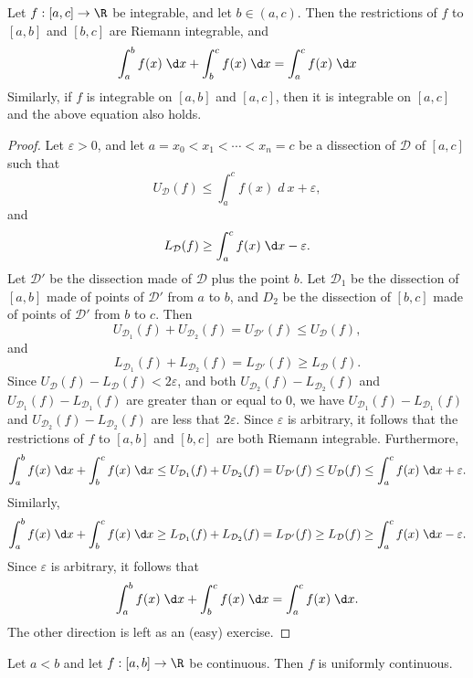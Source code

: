\documentclass[a4paper]{article}
\begin{document}
\begin{prop}
  Let $f: [a, c] \to \R$ be integrable, and let $b\in (a, c)$. Then the restrictions of $f$ to $[a, b]$ and $[b, c]$ are Riemann integrable, and
  \[
    \int_a^b f(x)\;\d x + \int_b^c f(x)\;\d x = \int_a^c f(x) \;\d x
  \]
  Similarly, if $f$ is integrable on $[a, b]$ and $[a, c]$, then it is integrable on $[a, c]$ and the above equation also holds.
\end{prop}

\begin{proof}
  Let $\varepsilon> 0$, and let $a = x_0 < x_1 < \cdots < x_n = c$ be a dissection of $\mathcal{D}$ of $[a, c]$ such that
  \[
    U_\mathcal{D}(f) \leq \int_a^c f(x)\;d\ x + \varepsilon,
  \]
  and
  \[
    L_\mathcal{D}(f) \geq \int_a^c f(x)\;\d x - \varepsilon.
  \]
  Let $\mathcal{D}'$ be the dissection made of $\mathcal{D}$ plus the point $b$. Let $\mathcal{D}_1$ be the dissection of $[a, b]$ made of points of $\mathcal{D}'$ from $a$ to $b$, and $D_2$ be the dissection of $[b, c]$ made of points of $\mathcal{D}'$ from $b$ to $c$. Then
  \[
    U_{\mathcal{D}_1}(f) + U_{\mathcal{D}_2}(f) = U_{\mathcal{D}'}(f) \leq U_{\mathcal{D}}(f),
  \]
  and
  \[
    L_{\mathcal{D}_1}(f) + L_{\mathcal{D}_2}(f) = L_{\mathcal{D}'}(f) \geq L_\mathcal{D} (f).
  \]
  Since $U_\mathcal{D}(f) - L_\mathcal{D}(f) < 2\varepsilon$, and both $U_{\mathcal{D}_2}(f) - L_{\mathcal{D}_2} (f)$ and $U_{\mathcal{D}_1}(f) - L_{\mathcal{D}_1} (f)$ are greater than or equal to $0$, we have $U_{\mathcal{D}_1} (f) - L_{\mathcal{D}_1} (f)$ and $U_{\mathcal{D}_2}(f) - L_{\mathcal{D}_2}(f)$ are less that $2\varepsilon$. Since $\varepsilon$ is arbitrary, it follows that the restrictions of $f$ to $[a, b]$ and $[b, c]$ are both Riemann integrable. Furthermore,
  \[
    \int_a^b f(x)\;\d x + \int_b^c f(x)\;\d x \leq U_{\mathcal{D}_1}(f) + U_{\mathcal{D}_2}(f) = U_{\mathcal{D}'}(f) \leq U_{\mathcal{D}}(f) \leq \int_a^c f(x)\;\d x + \varepsilon.
  \]
  Similarly,
  \[
    \int_a^bf(x)\;\d x + \int_b^cf(x)\;\d x \geq L_{\mathcal{D}_1}(f) + L_{\mathcal{D}_2}(f) = L_{\mathcal{D}'}(f) \geq L_{\mathcal{D}}(f) \geq \int_a^c f(x)\;\d x - \varepsilon.
  \]
  Since $\varepsilon$ is arbitrary, it follows that
  \[
    \int_a^b f(x)\;\d x + \int_b^c f(x)\;\d x = \int_a^c f(x)\;\d x.
  \]
  The other direction is left as an (easy) exercise.
\end{proof}

\begin{thm}
  Let $a < b$ and let $f: [a, b] \to \R$ be continuous. Then $f$ is uniformly continuous.
\end{thm}
\end{document}
